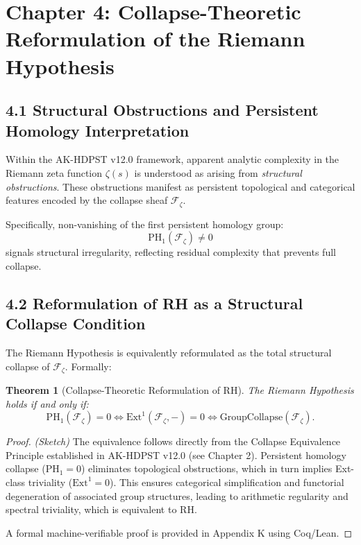 \documentclass[11pt]{article}
\newtheorem{theorem}{Theorem}[section]
\begin{document}
\section{Chapter 4: Collapse-Theoretic Reformulation of the Riemann Hypothesis}

\subsection*{4.1 Structural Obstructions and Persistent Homology Interpretation}

Within the AK-HDPST v12.0 framework, apparent analytic complexity in the Riemann zeta function $\zeta(s)$ is understood as arising from \textit{structural obstructions}. These obstructions manifest as persistent topological and categorical features encoded by the collapse sheaf $\mathcal{F}_{\zeta}$.

Specifically, non-vanishing of the first persistent homology group:
\[
\mathrm{PH}_1(\mathcal{F}_{\zeta}) \neq 0
\]
signals structural irregularity, reflecting residual complexity that prevents full collapse.

\subsection*{4.2 Reformulation of RH as a Structural Collapse Condition}

The Riemann Hypothesis is equivalently reformulated as the total structural collapse of $\mathcal{F}_{\zeta}$. Formally:

\begin{theorem}[Collapse-Theoretic Reformulation of RH]
The Riemann Hypothesis holds if and only if:
\[
\mathrm{PH}_1(\mathcal{F}_{\zeta}) = 0 \iff \mathrm{Ext}^1(\mathcal{F}_{\zeta}, -) = 0 \iff \mathrm{GroupCollapse}(\mathcal{F}_{\zeta}).
\]
\end{theorem}

\begin{proof}
\textit{(Sketch)}  
The equivalence follows directly from the Collapse Equivalence Principle established in AK-HDPST v12.0 (see Chapter 2). Persistent homology collapse ($\mathrm{PH}_1 = 0$) eliminates topological obstructions, which in turn implies Ext-class triviality ($\mathrm{Ext}^1 = 0$). This ensures categorical simplification and functorial degeneration of associated group structures, leading to arithmetic regularity and spectral triviality, which is equivalent to RH.

A formal machine-verifiable proof is provided in Appendix K using Coq/Lean.
\end{proof}
\end{document}
